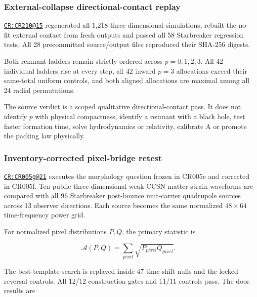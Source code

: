 \subsubsection{External-collapse directional-contact
replay}\label{viii-ch08-external-collapse-directional-contact-replay}

\href{https://github.com/iwtbotiwtwot/SAMA/blob/4c2b5dc1649da5900c90b90d0ce56c223dbb7717/tests/courtroom/15-scale-bridge-simulator-cr210-starbreaker-3d-external-collapse-contact/README.md}{\texttt{CR:CR210@15}}
regenerated all 1,218 three-dimensional simulations, rebuilt the no-fit
external contact from fresh outputs and passed all 58 Starbreaker
regression tests. All 28 precommitted source/output files reproduced
their SHA-256 digests.

Both remnant ladders remain strictly ordered across \(p=0,1,2,3\). All
42 individual ladders rise at every step, all 42 inward \(p=3\)
allocations exceed their same-total uniform controls, and both aligned
allocations are maximal among all 24 radial permutations.

The source verdict is a scoped qualitative directional-contact pass. It
does not identify \(p\) with physical compactness, identify a remnant
with a black hole, test faster formation time, solve hydrodynamics or
relativity, calibrate A or promote the packing law physically.

\subsubsection{Inventory-corrected pixel-bridge
retest}\label{viii-ch08-inventory-corrected-pixel-bridge-retest}

\href{https://github.com/iwtbotiwtwot/SAMA/blob/4c2b5dc1649da5900c90b90d0ce56c223dbb7717/tests/courtroom/21-gravitational-waves-cr005g-starbreaker-weak-ccsn-pixel-bridge-inventory-corrected/README.md}{\texttt{CR:CR005g@21}}
executes the morphology question frozen in CR005e and corrected in
CR005f. Ten public three-dimensional weak-CCSN matter-strain waveforms
are compared with all 96 Starbreaker post-bounce unit-carrier quadrupole
sources across 13 observer directions. Each source becomes the same
normalized \(48\times64\) time-frequency power grid.

For normalized pixel distributions \(P,Q\), the primary statistic is

\[
\mathcal A(P,Q)=\sum_{pixel}\sqrt{P_{pixel}Q_{pixel}}.
\]

The best-template search is replayed inside 47 time-shift nulls and the
locked reversal controls. All 12/12 construction gates and 11/11
controls pass. The door results are

